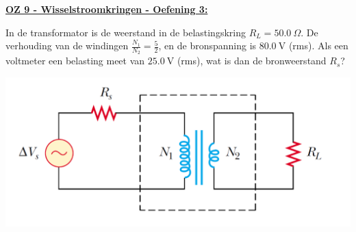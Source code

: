\textbf{\underline{OZ 9 - Wisselstroomkringen - Oefening 3:}}
\vspace{0.5cm}

In de transformator is de weerstand in de belastingskring $R_L = 50.0 \ \Omega$. De verhouding van de windingen $\tfrac{N_1}{N_2} = \tfrac{5}{2}$, en de bronspanning is $80.0 \ \text{V}$ (rms). Als een voltmeter een belasting meet van $25.0 \ \text{V}$ (rms), wat is dan de bronweerstand $R_s$?


\begin{center}
    \includegraphics[scale = 0.4]{oz09/resources/Oz9Oef3.png}
\end{center}

\begin{description}[labelwidth=1.5cm, leftmargin=!]
    \item[Geg. :]   
    \item[Gevr. :] 
    \item[Opl. :]   
\end{description}

\vspace{1cm}